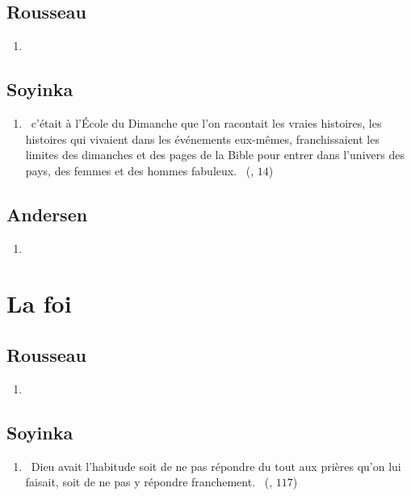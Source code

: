 \documentclass[a4paper, 11pt, hidelinks]{article}
\newcommand{\rb}[1]{\Romanbar{#1}}
\begin{document}
\subsection{Rousseau}

\begin{enumerate}
    \item 
\end{enumerate}


\subsection{Soyinka}


\begin{enumerate}
    \item \og{} c’était à l’École du Dimanche que l’on racontait les vraies histoires, les histoires qui vivaient dans les événements eux-mêmes, franchissaient les limites des dimanches et des pages de la Bible pour entrer dans l’univers des pays, des femmes et des hommes fabuleux. \fg{} (\rb{1}, $14$)
\end{enumerate}


\subsection{Andersen}


\begin{enumerate}
    \item 
\end{enumerate}

\section{La foi}




\subsection{Rousseau}

\begin{enumerate}
    \item 
\end{enumerate}


\subsection{Soyinka}


\begin{enumerate}
    \item \og{} Dieu avait l’habitude soit de ne pas répondre du tout aux prières qu’on lui faisait, soit de ne pas y répondre franchement. \fg{} (\rb{4}, $117$)
\end{enumerate}
\end{document}
